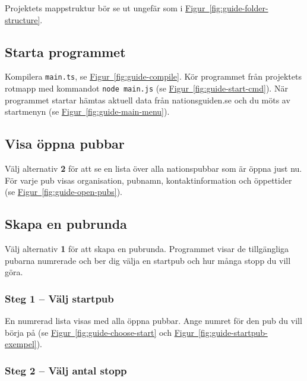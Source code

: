 \documentclass[a4paper, 12pt]{article}
\begin{document}
        Projektets mappstruktur bör se ut ungefär som i \hyperref[fig:guide-folder-structure]{Figur~\ref*{fig:guide-folder-structure}}.

    \subsection{Starta programmet}

        Kompilera \texttt{main.ts}, se \hyperref[fig:guide-compile]{Figur~\ref*{fig:guide-compile}}. Kör programmet från projektets rotmapp med kommandot \texttt{node main.js} (se \hyperref[fig:guide-start-cmd]{Figur~\ref*{fig:guide-start-cmd}}).
        När programmet startar hämtas aktuell data från nationsguiden.se och du möts av startmenyn (se \hyperref[fig:guide-main-menu]{Figur~\ref*{fig:guide-main-menu}}).

    \subsection{Visa öppna pubbar}

        Välj alternativ \textbf{2} för att se en lista över alla nationspubbar som är öppna just nu. För varje pub visas organisation, pubnamn, kontaktinformation och öppettider (se \hyperref[fig:guide-open-pubs]{Figur~\ref*{fig:guide-open-pubs}}).

    \subsection{Skapa en pubrunda}

        Välj alternativ \textbf{1} för att skapa en pubrunda. Programmet visar de tillgängliga pubarna numrerade och ber dig välja en startpub och hur många stopp du vill göra.

        \subsubsection*{Steg 1 -- Välj startpub}

        En numrerad lista visas med alla öppna pubbar. Ange numret för den pub du vill börja på (se \hyperref[fig:guide-choose-start]{Figur~\ref*{fig:guide-choose-start}} och \hyperref[fig:guide-startpub-exempel]{Figur~\ref*{fig:guide-startpub-exempel}}).

        \subsubsection*{Steg 2 -- Välj antal stopp}
\end{document}
